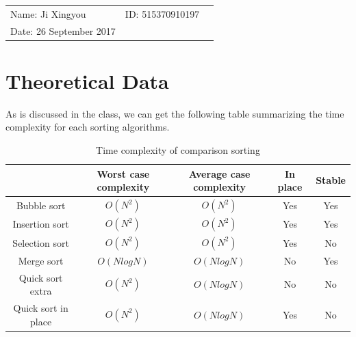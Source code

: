 \documentclass{article}
\begin{document}
\begin{spacing}{2.0}
\vspace*{0.25cm}

\hrulefill

\thispagestyle{empty}

\begin{center}
\begin{large}
\end{large}

\hrulefill

\vspace*{5cm}
\begin{Large}
\end{Large}

\vspace{2em}

\end{center}


\vfill

\begin{table}[h!]
\flushleft
\begin{tabular}{lll}
Name: Ji Xingyou \hspace*{2em}&
ID: 515370910197\hspace*{2em}
\\

Date: 26 September 2017

\end{tabular}
\end{table}

\hfill

\newpage
\tableofcontents
\newpage
\section{Theoretical Data}
\indent As is discussed in the class, we can get the following table summarizing the time complexity for each sorting algorithms.

\begin{table}[!hbp]
\centering
\begin{tabular}{ccccc}
&Worst case complexity&Average case complexity&In place&Stable\\
\hline
\hline
Bubble sort&$O(N^2)$&$O(N^2)$&Yes&Yes\\
\hline
Insertion sort&$O(N^2)$&$O(N^2)$&Yes&Yes\\
\hline
Selection sort&$O(N^2)$&$O(N^2)$&Yes&No\\
\hline
Merge sort&$O(NlogN)$&$O(NlogN)$&No&Yes\\
\hline
Quick sort extra&$O(N^2)$&$O(NlogN)$&No&No\\
\hline
Quick sort in place&$O(N^2)$&$O(NlogN)$&Yes&No\\
\hline
\end{tabular}
\caption{Time complexity of comparison sorting}
\end{table}


\end{spacing}
\end{document}
